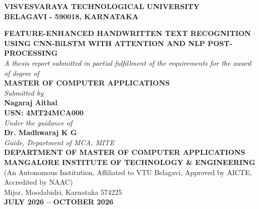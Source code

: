
\begin{titlepage}
\begin{center}
    {\large \textbf{VISVESVARAYA TECHNOLOGICAL UNIVERSITY}} \\
    {\large \textbf{BELAGAVI - 590018, KARNATAKA}} \\
    \vspace{1.5cm}
    \begin{figure}[h!]
        \centering
        \vspace{2cm} %
    \end{figure}
    \vspace{0.5cm}
    {\Large \textbf{FEATURE-ENHANCED HANDWRITTEN TEXT RECOGNITION USING CNN-BiLSTM WITH ATTENTION AND NLP POST-PROCESSING}} \\
    \vspace{1.5cm}
    \textit{A thesis report submitted in partial fulfillment of the requirements for the award of degree of} \\
    \vspace{0.5cm}
    {\large \textbf{MASTER OF COMPUTER APPLICATIONS}} \\
    \vspace{1.0cm}
    \textit{Submitted by} \\
    \vspace{0.3cm}
    {\large \textbf{Nagaraj Aithal}} \\
    {\large \textbf{USN: 4MT24MCA000}} \\
    \vspace{1.0cm}
    \textit{Under the guidance of} \\
    \vspace{0.3cm}
    {\large \textbf{Dr. Madhwaraj K G}} \\
    \textit{Guide, Department of MCA, MITE} \\
    \vspace{1.5cm}
    \vspace{1.0cm}
    \textbf{DEPARTMENT OF MASTER OF COMPUTER APPLICATIONS} \\
    \textbf{MANGALORE INSTITUTE OF TECHNOLOGY \& ENGINEERING} \\
    {\small (An Autonomous Institution, Affiliated to VTU Belagavi, Approved by AICTE, Accredited by NAAC)} \\
    {\small Mijar, Moodabidri, Karnataka 574225} \\
    \vspace{0.8cm}
    \textbf{JULY 2026 -- OCTOBER 2026}
\end{center}
\end{titlepage}

